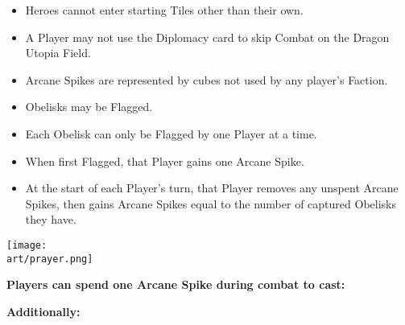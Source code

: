 \begin{multicols}{2}
\begin{itemize}
  \item Heroes cannot enter starting Tiles other than their own.
  \item A Player may not use the Diplomacy card to skip Combat on the Dragon Utopia Field.
  \item Arcane Spikes are represented by cubes not used by any player's Faction.
  \item Obelisks may be Flagged. 
  \item Each Obelisk can only be Flagged by one Player at a time.
  \item When first Flagged, that Player gains one Arcane Spike.
  \item At the start of each Player's turn, that Player removes any unspent Arcane Spikes, then gains Arcane Spikes equal to the number of captured Obelisks they have.
\end{itemize}

\vspace{1em}

\texttt{[image: \\art/prayer.png]}

\vspace*{\fill}

\columnbreak

\textbf{Players can spend one Arcane Spike during combat to cast:}


\textbf{Additionally:}


\end{multicols}
